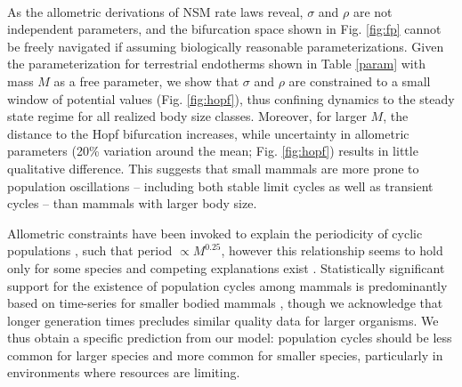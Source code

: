 \documentclass{pnastwo}
\begin{document}
\begin{article}
\vspace{2mm}
 \\ \noindent


As the allometric derivations of NSM rate laws reveal, $\sigma$ and $\rho$ are not independent parameters, and the bifurcation space shown in Fig. \ref{fig:fp} cannot be freely navigated if assuming biologically reasonable parameterizations.
Given the parameterization for terrestrial endotherms shown in Table \ref{param} with mass $M$ as a free parameter, we show that $\sigma$ and $\rho$ are constrained to a small window of potential values (Fig. \ref{fig:hopf}), thus confining dynamics to the steady state regime for all realized body size classes.
Moreover, for larger $M$, the distance to the Hopf bifurcation increases, while uncertainty in allometric parameters (20\% variation around the mean; Fig. \ref{fig:hopf}) results in little qualitative difference.
This suggests that small mammals are more prone to population oscillations -- including both stable limit cycles as well as transient cycles -- than mammals with larger body size. %


Allometric constraints have been invoked to explain the periodicity of cyclic populations \cite{CalderIII:1983jd,Peterson:1984hj,Krukonis:1991fk}, such that period $\propto M^{0.25}$, however this relationship seems to hold only for some species \cite{Hendriks:2012fc} and competing explanations exist \cite{Kendall:1999iy,Hogstedt:2005cr}.
Statistically significant support for the existence of population cycles among mammals is predominantly based on time-series for smaller bodied mammals \cite{Kendall:1998hl}, though we acknowledge that longer generation times precludes similar quality data for larger organisms.
We thus obtain a specific prediction from our model: population cycles should be less common for larger species and more common for smaller species, particularly in environments where resources are limiting. %





\end{article}
\end{document}
